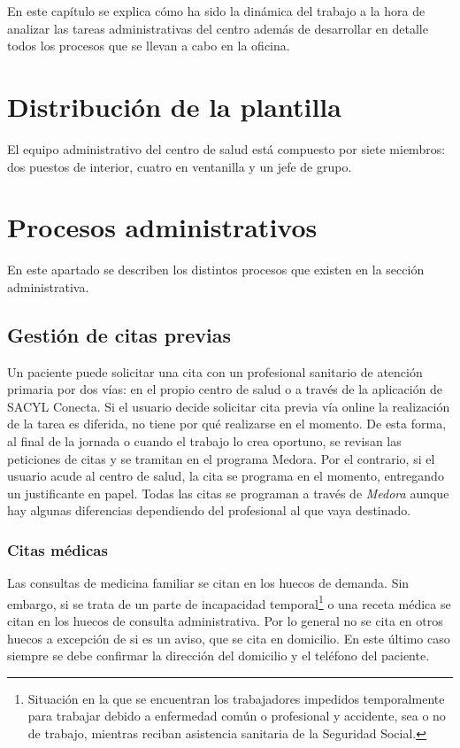 En este capítulo se explica cómo ha sido la dinámica del trabajo a la hora de analizar las tareas administrativas del centro además de desarrollar en detalle todos los procesos que se llevan a cabo en la oficina.

\section{Distribución de la plantilla}

El equipo administrativo del centro de salud está compuesto por siete miembros: dos puestos de interior, cuatro en ventanilla y un jefe de grupo.

\section{Procesos administrativos}

En este apartado se describen los distintos procesos que existen en la sección administrativa. 

\subsection{Gestión de citas previas}

Un paciente puede solicitar una cita con un profesional sanitario de atención primaria por dos vías: en el propio centro de salud o a través de la aplicación de SACYL Conecta.
Si el usuario decide solicitar cita previa vía online la realización de la tarea es diferida, no tiene por qué realizarse en el momento.
De esta forma, al final de la jornada o cuando el trabajo lo crea oportuno, se revisan las peticiones de citas y se tramitan en el programa Medora.
Por el contrario, si el usuario acude al centro de salud, la cita se programa en el momento, entregando un justificante en papel.
Todas las citas se programan a través de \textit{Medora} aunque hay algunas diferencias dependiendo del profesional al que vaya destinado.

\subsubsection{Citas médicas}

Las consultas de medicina familiar se citan en los huecos de demanda.
Sin embargo, si se trata de un parte de incapacidad temporal\footnote{Situación en la que se encuentran los trabajadores impedidos temporalmente para trabajar debido a enfermedad común o profesional y accidente, sea o no de trabajo, mientras reciban asistencia sanitaria de la Seguridad Social.} o una receta médica se citan en los huecos de consulta administrativa.
Por lo general no se cita en otros huecos a excepción de si es un aviso, que se cita en domicilio.
En este último caso siempre se debe confirmar la dirección del domicilio y el teléfono del paciente.

